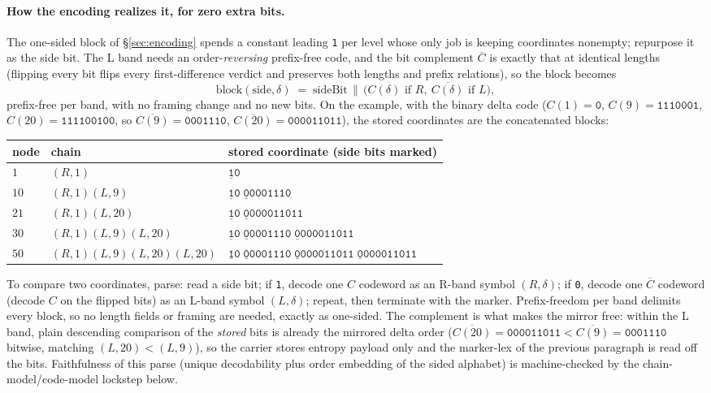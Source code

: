 \documentclass[11pt]{article}
\newcommand{\code}[1]{\texttt{#1}}
\begin{document}
\paragraph{How the encoding realizes it, for zero extra bits.} The
one-sided block of \S\ref{sec:encoding} spends a constant leading
\code{1} per level whose only job is keeping coordinates nonempty;
repurpose it as the side bit. The L band needs an
order-\emph{reversing} prefix-free code, and the bit complement
$\overline{C}$ is exactly that at identical lengths (flipping every
bit flips every first-difference verdict and preserves both lengths
and prefix relations), so the block becomes
\[
  \mathrm{block}(\mathrm{side}, \delta) \;=\; \mathrm{sideBit}
  \,\|\, \bigl(C(\delta) \text{ if } R,\ \overline{C(\delta)}
  \text{ if } L\bigr),
\]
prefix-free per band, with no framing change and no new bits. On the
example, with the binary delta code ($C(1) = \code{0}$, $C(9) =
\code{1110001}$, $C(20) = \code{111100100}$, so $\overline{C(9)} =
\code{0001110}$, $\overline{C(20)} = \code{000011011}$), the stored
coordinates are the concatenated blocks:
\begin{center}\small
\begin{tabular}{@{}lll@{}}
\toprule
node & chain & stored coordinate (side bits marked) \\
\midrule
$1$  & $(R,1)$ &
  $\underline{\code{1}}\code{0}$ \\
$10$ & $(R,1)(L,9)$ &
  $\underline{\code{1}}\code{0}\;\underline{\code{0}}\code{0001110}$ \\
$21$ & $(R,1)(L,20)$ &
  $\underline{\code{1}}\code{0}\;\underline{\code{0}}\code{000011011}$ \\
$30$ & $(R,1)(L,9)(L,20)$ &
  $\underline{\code{1}}\code{0}\;\underline{\code{0}}\code{0001110}\;
   \underline{\code{0}}\code{000011011}$ \\
$50$ & $(R,1)(L,9)(L,20)(L,20)$ &
  $\underline{\code{1}}\code{0}\;\underline{\code{0}}\code{0001110}\;
   \underline{\code{0}}\code{000011011}\;
   \underline{\code{0}}\code{000011011}$ \\
\bottomrule
\end{tabular}
\end{center}
To compare two coordinates, parse: read a side bit; if \code{1},
decode one $C$ codeword as an R-band symbol $(R,\delta)$; if \code{0},
decode one $\overline{C}$ codeword (decode $C$ on the flipped bits) as
an L-band symbol $(L,\delta)$; repeat, then terminate with the marker.
Prefix-freedom per band delimits every block, so no length fields or
framing are needed, exactly as one-sided. The complement is what makes
the mirror free: within the L band, plain descending comparison of the
\emph{stored} bits is already the mirrored delta order ($
\overline{C(20)} = \code{000011011} < \overline{C(9)} = \code{0001110}
$ bitwise, matching $(L,20) < (L,9)$), so the carrier stores entropy
payload only and the marker-lex of the previous paragraph is read off
the bits. Faithfulness of this parse (unique decodability plus order
embedding of the sided alphabet) is machine-checked by the
chain-model/code-model lockstep below.
\end{document}
